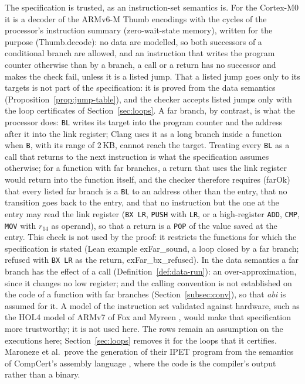 \documentclass[oneside,english]{amsart}
\numberwithin{equation}{section}
\theoremstyle{plain}
\theoremstyle{definition}
\theoremstyle{plain}
\theoremstyle{plain}
\theoremstyle{remark}
\newcommand{\lean}[1]{{\ttfamily\small #1}}
\begin{document}
The specification is trusted, as an instruction-set semantics is. For the Cortex-M0 it is a decoder of the ARMv6-M Thumb encodings with the cycles of the processor's instruction summary (zero-wait-state memory), written for the purpose (\lean{Thumb.\allowbreak decode}): no data are modelled, so both successors of a conditional branch are allowed, and an instruction that writes the program counter otherwise than by a branch, a call or a return has no successor and makes the check fail, unless it is a listed jump. That a listed jump goes only to its targets is not part of the specification: it is proved from the data semantics (Proposition~\ref{prop:jump-table}), and the checker accepts listed jumps only with the loop certificates of Section~\ref{sec:loops}. A far branch, by contrast, is what the processor does: \texttt{BL} writes its target into the program counter and the address after it into the link register; Clang uses it as a long branch inside a function when \texttt{B}, with its range of 2\,KB, cannot reach the target. Treating every \texttt{BL} as a call that returns to the next instruction is what the specification assumes otherwise; for a function with far branches, a return that uses the link register would return into the function itself, and the checker therefore requires (\lean{farOk}) that every listed far branch is a \texttt{BL} to an address other than the entry, that no transition goes back to the entry, and that no instruction but the one at the entry may read the link register (\texttt{BX LR}, \texttt{PUSH} with \texttt{LR}, or a high-register \texttt{ADD}, \texttt{CMP}, \texttt{MOV} with $r_{14}$ as operand), so that a return is a \texttt{POP} of the value saved at the entry. This check is not used by the proof: it restricts the functions for which the specification is stated (Lean example \lean{exFar\_\allowbreak sound}, a loop closed by a far branch; refused with \texttt{BX LR} as the return, \lean{exFar\_\allowbreak bx\_\allowbreak refused}). In the data semantics a far branch has the effect of a call (Definition~\ref{def:data-run}): an over-approximation, since it changes no low register; and the calling convention is not established on the code of a function with far branches (Section~\ref{subsec:conv}), so that \emph{abi} is assumed for it. A model of the instruction set validated against hardware, such as the HOL4 model of ARMv7 of Fox and Myreen \cite{fox2010trustworthy}, would make that specification more trustworthy; it is not used here. The rows remain an assumption on the executions here; Section~\ref{sec:loops} removes it for the loops that it certifies. Maroneze et al.\ prove the generation of their IPET program from the semantics of CompCert's assembly language \cite{maroneze2014formally}, where the code is the compiler's output rather than a binary.
\end{document}
